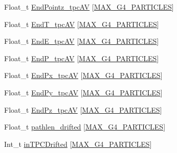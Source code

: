 \begin{DoxyCompactItemize}
\item 
Float\-\_\-t \hyperlink{classanatree_a88288469c893f3ecc7d10625a5a37b1c}{End\-Pointz\-\_\-tpc\-A\-V} \mbox{[}\hyperlink{anatree__core__v09410002__orig_8h_aa5cbba5cc53c011e88805f38503de894}{M\-A\-X\-\_\-\-G4\-\_\-\-P\-A\-R\-T\-I\-C\-L\-E\-S}\mbox{]}
\item 
Float\-\_\-t \hyperlink{classanatree_a4e1a7bede023edc6626c30d762b31866}{End\-T\-\_\-tpc\-A\-V} \mbox{[}\hyperlink{anatree__core__v09410002__orig_8h_aa5cbba5cc53c011e88805f38503de894}{M\-A\-X\-\_\-\-G4\-\_\-\-P\-A\-R\-T\-I\-C\-L\-E\-S}\mbox{]}
\item 
Float\-\_\-t \hyperlink{classanatree_a16584dc21d831d967da68d2b7dec4ccf}{End\-E\-\_\-tpc\-A\-V} \mbox{[}\hyperlink{anatree__core__v09410002__orig_8h_aa5cbba5cc53c011e88805f38503de894}{M\-A\-X\-\_\-\-G4\-\_\-\-P\-A\-R\-T\-I\-C\-L\-E\-S}\mbox{]}
\item 
Float\-\_\-t \hyperlink{classanatree_afc7c1fefd00749006c2bb4f3d1b58b5f}{End\-P\-\_\-tpc\-A\-V} \mbox{[}\hyperlink{anatree__core__v09410002__orig_8h_aa5cbba5cc53c011e88805f38503de894}{M\-A\-X\-\_\-\-G4\-\_\-\-P\-A\-R\-T\-I\-C\-L\-E\-S}\mbox{]}
\item 
Float\-\_\-t \hyperlink{classanatree_a8118bff57ec868b5c21473ff56e91fe8}{End\-Px\-\_\-tpc\-A\-V} \mbox{[}\hyperlink{anatree__core__v09410002__orig_8h_aa5cbba5cc53c011e88805f38503de894}{M\-A\-X\-\_\-\-G4\-\_\-\-P\-A\-R\-T\-I\-C\-L\-E\-S}\mbox{]}
\item 
Float\-\_\-t \hyperlink{classanatree_ae56bc5885df964287d74596ca6e4aaf8}{End\-Py\-\_\-tpc\-A\-V} \mbox{[}\hyperlink{anatree__core__v09410002__orig_8h_aa5cbba5cc53c011e88805f38503de894}{M\-A\-X\-\_\-\-G4\-\_\-\-P\-A\-R\-T\-I\-C\-L\-E\-S}\mbox{]}
\item 
Float\-\_\-t \hyperlink{classanatree_a9fb4a6d5e46a409129e5f53dbaee5e55}{End\-Pz\-\_\-tpc\-A\-V} \mbox{[}\hyperlink{anatree__core__v09410002__orig_8h_aa5cbba5cc53c011e88805f38503de894}{M\-A\-X\-\_\-\-G4\-\_\-\-P\-A\-R\-T\-I\-C\-L\-E\-S}\mbox{]}
\item 
Float\-\_\-t \hyperlink{classanatree_a10be797dd4bcb299896e159ba44755b6}{pathlen\-\_\-drifted} \mbox{[}\hyperlink{anatree__core__v09410002__orig_8h_aa5cbba5cc53c011e88805f38503de894}{M\-A\-X\-\_\-\-G4\-\_\-\-P\-A\-R\-T\-I\-C\-L\-E\-S}\mbox{]}
\item 
Int\-\_\-t \hyperlink{classanatree_af0d8948732aa5f642cdb5e376d432b2e}{in\-T\-P\-C\-Drifted} \mbox{[}\hyperlink{anatree__core__v09410002__orig_8h_aa5cbba5cc53c011e88805f38503de894}{M\-A\-X\-\_\-\-G4\-\_\-\-P\-A\-R\-T\-I\-C\-L\-E\-S}\mbox{]}

\end{DoxyCompactItemize}
